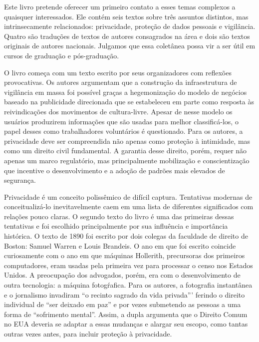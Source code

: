Este livro pretende oferecer um primeiro contato a esses temas complexos
a quaisquer interessados. Ele contém seis textos sobre três assuntos
distintos, mas intrinsecamente relacionados: privacidade, proteção de
dados pessoais e vigilância. Quatro são traduções de textos de autores
consagrados na área e dois são textos originais de autores nacionais.
Julgamos que essa coletânea possa vir a ser útil em cursos de graduação
e pós-graduação.

O livro começa com um texto escrito por seus organizadores com reflexões
provocativas. Os autores argumentam que a construção da infraestrutura
de vigilância em massa foi possível graças a hegemonização do modelo de
negócios baseado na publicidade direcionada que se estabeleceu em parte
como resposta às reivindicações dos movimentos de cultura-livre. Apesar
de nesse modelo os usuários produzirem informações que são usadas para
melhor classificá-los, o papel desses como trabalhadores voluntários é
questionado. Para os autores, a privacidade deve ser compreendida não
apenas como proteção à intimidade, mas como um direito civil
fundamental. A garantia desse direito, porém, requer não apenas um marco
regulatório, mas principalmente mobilização e conscientização que
incentive o desenvolvimento e a adoção de padrões mais elevados de
segurança.

Privacidade é um conceito polissêmico de difícil captura. Tentativas
modernas de conceitualizá-lo inevitavelmente caem em uma lista de
diferentes significados com relações pouco claras. O segundo texto do
livro é uma das primeiras dessas tentativas e foi escolhido
principalmente por sua influência e importância histórica. O texto de
1890 foi escrito por dois colegas da faculdade de direito de Boston:
Samuel Warren e Louis Brandeis. O ano em que foi escrito coincide
curiosamente com o ano em que máquinas Hollerith, precursoras dos
primeiros computadores, eram usadas pela primeira vez para processar o
censo nos Estados Unidos. A preocupação dos advogados, porém, era com o
desenvolvimento de outra tecnologia: a máquina fotogŕafica. Para os
autores, a fotografia instantânea e o jornalismo invadiram ``o recinto
sagrado da vida privada''' ferindo o direito individual de ``ser deixado
em paz'' e por vezes submetendo as pessoas a uma forma de ``sofrimento
mental''. Assim, a dupla argumenta que o Direito Comum no EUA deveria se
adaptar a essas mudanças e alargar seu escopo, como tantas outras vezes
antes, para incluir proteção à privacidade.

